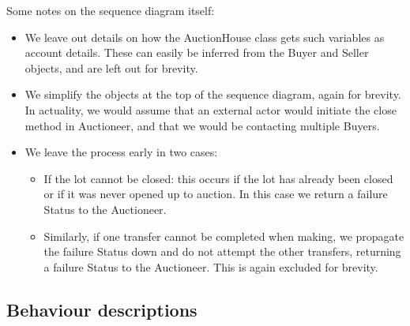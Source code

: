 \documentclass[titlepage, 12pt]{extarticle}
\begin{document}
\noindent Some notes on the sequence diagram itself:
\begin{itemize}
  \item We leave out details on how the AuctionHouse class gets such variables as account details. These can easily be inferred from the Buyer and Seller objects, and are left out for brevity. 
  \item We simplify the objects at the top of the sequence diagram, again for brevity. In actuality, we would assume that an external actor would initiate the close method in Auctioneer, and that we would be contacting multiple Buyers.
  \item We leave the process early in two cases:
    \begin{itemize}
      \item If the lot cannot be closed: this occurs if the lot has already been closed or if it was never opened up to auction. In this case we return a failure Status to the Auctioneer.
      \item Similarly, if one transfer cannot be completed when making, we propagate the failure Status down and do not attempt the other transfers, returning a failure Status to the Auctioneer. This is again excluded for brevity.
    \end{itemize}
\end{itemize}

\subsection{Behaviour descriptions}
\end{document}

